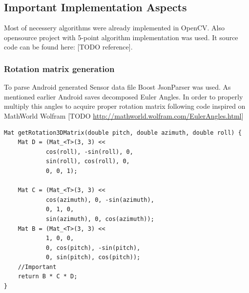 \subsection{Important Implementation Aspects}
Most of necessery algorithms were already implemented in OpenCV. Also opensource project with 5-point algorithm implementation was used. It source code can be found here: [TODO reference].
\subsubsection{Rotation matrix generation}
To parse Android generated Sensor data file Boost JsonParser was used. As mentioned earlier Android saves decomposed Euler Angles. In order to properly multiply this angles to acquire proper rotation matrix following code inspired on MathWorld Wolfram [TODO \url{http://mathworld.wolfram.com/EulerAngles.html}]
\begin{lstlisting}
Mat getRotation3DMatrix(double pitch, double azimuth, double roll) {
    Mat D = (Mat_<T>(3, 3) <<
            cos(roll), -sin(roll), 0,
            sin(roll), cos(roll), 0,
            0, 0, 1);

    Mat C = (Mat_<T>(3, 3) <<
            cos(azimuth), 0, -sin(azimuth),
            0, 1, 0,
            sin(azimuth), 0, cos(azimuth));
    Mat B = (Mat_<T>(3, 3) <<
            1, 0, 0,
            0, cos(pitch), -sin(pitch),
            0, sin(pitch), cos(pitch));
    //Important
    return B * C * D;
}
\end{lstlisting}
